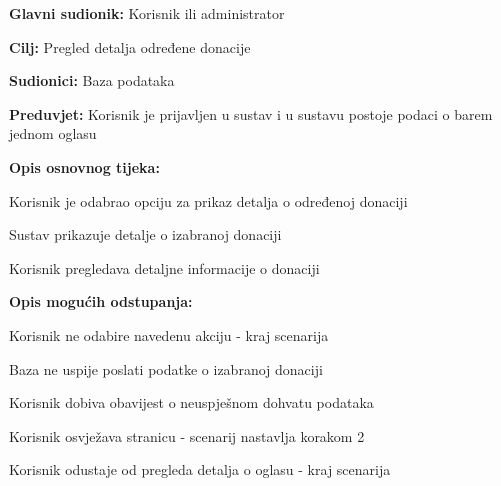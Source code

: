 					\noindent {}
					\begin{packed_item}
	
						\item \textbf{Glavni sudionik: }Korisnik ili administrator
						\item  \textbf{Cilj:} Pregled detalja određene donacije
						\item  \textbf{Sudionici:} Baza podataka
						\item  \textbf{Preduvjet:} Korisnik je prijavljen u sustav i u sustavu postoje podaci o barem jednom oglasu
						\item  \textbf{Opis osnovnog tijeka:}
						
						\item[] \begin{packed_enum}
							\item Korisnik je odabrao opciju za prikaz detalja o određenoj donaciji
							\item Sustav prikazuje detalje o izabranoj donaciji
							\item Korisnik pregledava detaljne informacije o donaciji
						\end{packed_enum}

						\item  \textbf{Opis mogućih odstupanja:}

						\item[] \begin{packed_item}
							\item[1.a] Korisnik ne odabire navedenu akciju - kraj scenarija
							\item[2.a] Baza ne uspije poslati podatke o izabranoj donaciji
							\item[] \begin{packed_enum}
								
								\item Korisnik dobiva obavijest o neuspješnom dohvatu podataka
								\item
									\begin{packed_enum}
										\item Korisnik osvježava stranicu - scenarij nastavlja korakom 2
										\item Korisnik odustaje od pregleda detalja o oglasu - kraj scenarija
									\end{packed_enum}	
							
							\end{packed_enum}	
						\end{packed_item}	
					\end{packed_item}

